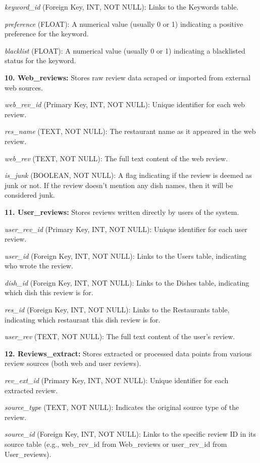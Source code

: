 \textit{keyword\_id} (Foreign Key, INT, NOT NULL): Links to the Keywords table.

\textit{preference} (FLOAT): A numerical value (usually 0 or 1) indicating a positive preference for the keyword.

\textit{blacklist} (FLOAT): A numerical value (usually 0 or 1) indicating a blacklisted status for the keyword.

\textbf{10. Web\_reviews:} Stores raw review data scraped or imported from external web sources.

\textit{web\_rev\_id} (Primary Key, INT, NOT NULL): Unique identifier for each web review.

\textit{res\_name} (TEXT, NOT NULL): The restaurant name as it appeared in the web review.

\textit{web\_rev} (TEXT, NOT NULL): The full text content of the web review.

\textit{is\_junk} (BOOLEAN, NOT NULL): A flag indicating if the review is deemed as junk or not. If the review doesn’t mention any dish names, then it will be considered junk.

\textbf{11. User\_reviews:} Stores reviews written directly by users of the system.

\textit{user\_rev\_id} (Primary Key, INT, NOT NULL): Unique identifier for each user review.

\textit{user\_id} (Foreign Key, INT, NOT NULL): Links to the Users table, indicating who wrote the review.

\textit{dish\_id} (Foreign Key, INT, NOT NULL): Links to the Dishes table, indicating which dish this review is for.

\textit{res\_id} (Foreign Key, INT, NOT NULL): Links to the Restaurants table, indicating which restaurant this dish review is for.

\textit{user\_rev} (TEXT, NOT NULL): The full text content of the user's review.

\textbf{12. Reviews\_extract:} Stores extracted or processed data points from various review sources (both web and user reviews).

\textit{rev\_ext\_id} (Primary Key, INT, NOT NULL): Unique identifier for each extracted review.

\textit{source\_type} (TEXT, NOT NULL): Indicates the original source type of the review.

\textit{source\_id} (Foreign Key, INT, NOT NULL): Links to the specific review ID in its source table (e.g., web\_rev\_id from Web\_reviews or user\_rev\_id from User\_reviews).

